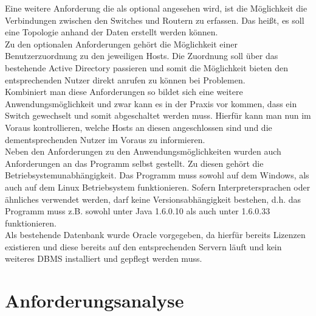Eine weitere Anforderung die als optional angesehen wird, ist die Möglichkeit die Verbindungen zwischen den Switches und Routern zu erfassen. Das heißt, es soll eine Topologie anhand der Daten erstellt werden können.\\
Zu den optionalen Anforderungen gehört die Möglichkeit einer Benutzerzuordnung zu den jeweiligen Hosts. Die Zuordnung soll über das bestehende Active Directory passieren und somit die Möglichkeit bieten den entsprechenden Nutzer direkt anrufen zu können bei Problemen.\\
Kombiniert man diese Anforderungen so bildet sich eine weitere Anwendungsmöglichkeit und zwar kann es in der Praxis vor kommen, dass ein Switch gewechselt und somit abgeschaltet werden muss. Hierfür kann man nun im Voraus kontrollieren, welche Hosts an diesen angeschlossen sind und die dementsprechenden Nutzer im Voraus zu informieren.\\

Neben den Anforderungen zu den Anwendungsmöglichkeiten wurden auch Anforderungen an das Programm selbst gestellt.
Zu diesen gehört die Betriebsystemunabhängigkeit.
Das Programm muss sowohl auf dem Windows, als auch auf dem Linux Betriebsystem funktionieren. Sofern Interpretersprachen oder ähnliches verwendet werden, darf keine Versionsabhängigkeit bestehen, d.h. das Programm muss z.B. sowohl unter Java 1.6.0.10 als auch unter 1.6.0.33 funktionieren.\\
Als bestehende Datenbank wurde Oracle vorgegeben, da hierfür bereits Lizenzen existieren und diese bereits auf den entsprechenden Servern läuft und kein weiteres DBMS installiert und gepflegt werden muss.\\

\section{Anforderungsanalyse}
\label{sec:anfanalyse}

